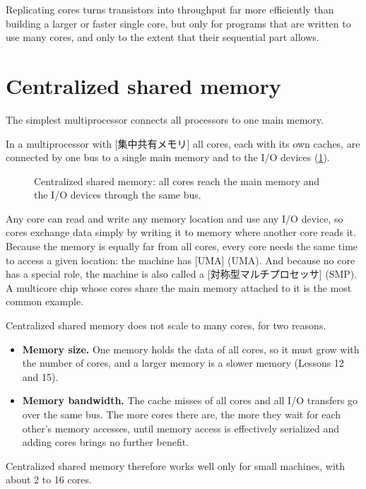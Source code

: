 \documentclass[../main.tex]{subfiles}
\begin{document}
\begin{keypoint}
  Replicating cores turns transistors into throughput far more efficiently
  than building a larger or faster single core, but only for programs that
  are written to use many cores, and only to the extent that their
  sequential part allows.
\end{keypoint}

\section{Centralized shared memory}
\label{sec:l18-centralized}

The simplest multiprocessor connects all processors to one main
memory.

\begin{definition}
  In a multiprocessor with [集中共有メモリ]
  all cores, each with its own caches, are connected by one bus to a single
  main memory and to the I/O devices (\cref{fig:l18-centralized}).
\end{definition}

\begin{figure}[htbp]
  \centering
  
  \caption{Centralized shared memory: all cores reach the main memory and
    the I/O devices through the same bus.}
  \label{fig:l18-centralized}
\end{figure}

Any core can read and write any memory location and use any I/O device, so
cores exchange data simply by writing it to memory where another core reads
it.  Because the memory is equally far from all cores, every core needs the
same time to access a given location: the machine has
[UMA]
(UMA).  And because no core has a special role, the machine is also called
a [対称型マルチプロセッサ]%
 (SMP).  A multicore chip whose
cores share the main memory attached to it is the most common example.

Centralized shared memory does not scale to many cores, for two reasons.
\begin{itemize}
  \item \textbf{Memory size.}  One memory holds the data of all cores, so it
    must grow with the number of cores, and a larger memory is a slower
    memory (Lessons 12 and 15).
  \item \textbf{Memory bandwidth.}  The cache misses of all cores and all
    I/O transfers go over the same bus.  The more cores there are, the more
    they wait for each other's memory accesses, until memory access is
    effectively serialized and adding cores brings no further benefit.
\end{itemize}
Centralized shared memory therefore works well only for small machines,
with about 2 to 16 cores.
\end{document}
